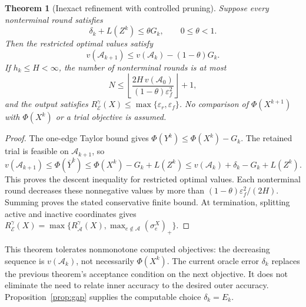 \documentclass[11pt]{article}
\newtheorem{theorem}{Theorem}
\begin{document}
\begin{theorem}[Inexact refinement with controlled pruning]\label{thm:refine}
Suppose every nonterminal round satisfies
$$\delta_k+L(Z^k)\leq\theta G_k,\qquad 0\leq\theta<1.$$
Then the restricted optimal values satisfy
$$v(\mathcal A_{k+1})\leq v(\mathcal A_k)-(1-\theta)G_k.$$
If $h_k\leq H<\infty$, the number of nonterminal rounds is at most
$$N\leq\left\lfloor\frac{2H\,v(\mathcal A_0)}{(1-\theta)\varepsilon_f^2}\right\rfloor+1,$$
and the output satisfies $R_{\mathcal E}^{\gamma}(X)\leq\max\{\varepsilon_r,\varepsilon_f\}$.
No comparison of $\Phi(X^{k+1})$ with $\Phi(X^k)$ or a trial objective is assumed.
\end{theorem}
\begin{proof}
The one-edge Taylor bound gives $\Phi(Y^k)\leq\Phi(X^k)-G_k$.
The retained trial is feasible on $\mathcal A_{k+1}$, so
$$v(\mathcal A_{k+1})\leq\Phi(\overline Y^k)\leq\Phi(X^k)-G_k+L(Z^k)\leq v(\mathcal A_k)+\delta_k-G_k+L(Z^k).$$
This proves the descent inequality for restricted optimal values.
Each nonterminal round decreases these nonnegative values by more than $(1-\theta)\varepsilon_f^2/(2H)$.
Summing proves the stated conservative finite bound.
At termination, splitting active and inactive coordinates gives $R_{\mathcal E}^{\gamma}(X)=\max\{R_{\mathcal A}^{\gamma}(X),\max_{e\notin\mathcal A}(\sigma_e^X)_+\}$.
\end{proof}

This theorem tolerates nonmonotone computed objectives: the decreasing sequence is $v(\mathcal A_k)$, not necessarily $\Phi(X^k)$.
The current oracle error $\delta_k$ replaces the previous theorem's acceptance condition on the next objective.
It does not eliminate the need to relate inner accuracy to the desired outer accuracy.
Proposition~\ref{prop:gap} supplies the computable choice $\delta_k=E_k$.
\end{document}
